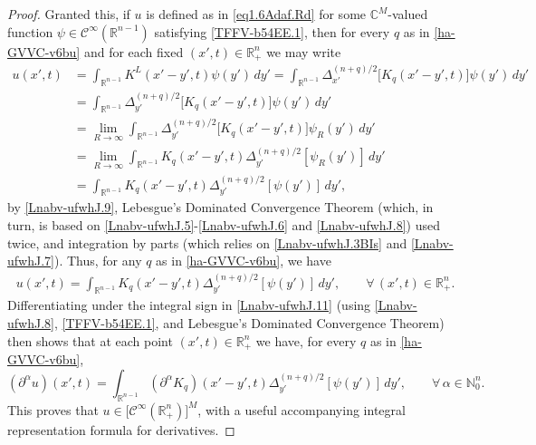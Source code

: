 \documentclass[11pt,reqno]{amsart}
\numberwithin{equation}{section}
\theoremstyle{remark}
\begin{document}
\begin{proof}
Granted this, if $u$ is defined as in \eqref{eq1.6Adaf.Rd} for some 
${\mathbb{C}}^{M}$-valued function $\psi\in{\mathscr{C}}^\infty({\mathbb{R}}^{n-1})$ 
satisfying \eqref{TFFV-b54EE.1}, then for every $q$ as in \eqref{ha-GVVC-v6bu}
and for each fixed $(x',t)\in{\mathbb{R}}^n_{+}$ we may write 
%
\begin{align}\label{Lnabv-ufwhJ.10}
u(x',t) &=\int_{{\mathbb{R}}^{n-1}}K^L(x'-y',t)\psi(y')\,dy'
=\int_{{\mathbb{R}}^{n-1}}\Delta_{x'}^{(n+q)/2}\big[K_q(x'-y',t)\big]\psi(y')\,dy'
\nonumber\\[4pt]
&=\int_{{\mathbb{R}}^{n-1}}\Delta_{y'}^{(n+q)/2}\big[K_q(x'-y',t)\big]\psi(y')\,dy'
\nonumber\\[4pt]
&=\lim_{R\to\infty}\int_{{\mathbb{R}}^{n-1}}
\Delta_{y'}^{(n+q)/2}\big[K_q(x'-y',t)\big]\psi_R(y')\,dy'
\nonumber\\[4pt]
&=\lim_{R\to\infty}\int_{{\mathbb{R}}^{n-1}}
K_q(x'-y',t)\Delta_{y'}^{(n+q)/2}[\psi_R(y')]\,dy'
\nonumber\\[4pt]
&=\int_{{\mathbb{R}}^{n-1}}K_q(x'-y',t)\Delta_{y'}^{(n+q)/2}[\psi(y')]\,dy',
\end{align}
%
by \eqref{Lnabv-ufwhJ.9}, Lebesgue's Dominated Convergence Theorem (which,
in turn, is based on \eqref{Lnabv-ufwhJ.5}-\eqref{Lnabv-ufwhJ.6} 
and \eqref{Lnabv-ufwhJ.8}) used twice, and integration by parts 
(which relies on \eqref{Lnabv-ufwhJ.3BIs} and \eqref{Lnabv-ufwhJ.7}).
Thus, for any $q$ as in \eqref{ha-GVVC-v6bu}, we have
%
\begin{align}\label{Lnabv-ufwhJ.11}
u(x',t)=\int_{{\mathbb{R}}^{n-1}}K_q(x'-y',t)\Delta_{y'}^{(n+q)/2}[\psi(y')]\,dy',
\qquad\forall\,(x',t)\in{\mathbb{R}}^n_{+}.
\end{align}
%
Differentiating under the integral sign in \eqref{Lnabv-ufwhJ.11} 
(using \eqref{Lnabv-ufwhJ.8}, \eqref{TFFV-b54EE.1}, and Lebesgue's Dominated Convergence Theorem)
then shows that at each point $(x',t)\in{\mathbb{R}}^n_{+}$ we have, for every $q$ as in \eqref{ha-GVVC-v6bu},  
%
\begin{equation}\label{Lnabv-ufwhJ.12}
(\partial^\alpha u)(x',t)=\int_{{\mathbb{R}}^{n-1}}(\partial^\alpha K_q)(x'-y',t)\Delta_{y'}^{(n+q)/2}[\psi(y')]\,dy',
\qquad\forall\,\alpha\in{\mathbb{N}}_0^n. 
\end{equation}
%
This proves that $u\in\big[{\mathscr{C}}^\infty({\mathbb{R}}^n_{+})\big]^M$, with a useful 
accompanying integral representation formula for derivatives.


\end{proof}
\end{document}
